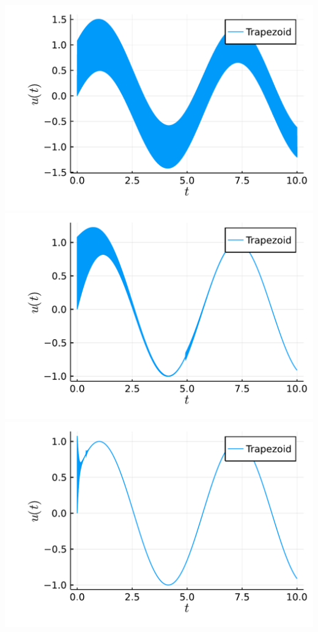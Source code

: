 \documentclass[12pt,a4paper]{article}
\begin{document}
\includegraphics[width=\linewidth]{figures/ass_1_report_10_1.pdf}
\includegraphics[width=\linewidth]{figures/ass_1_report_10_2.pdf}
\includegraphics[width=\linewidth]{figures/ass_1_report_10_3.pdf}
\end{document}
